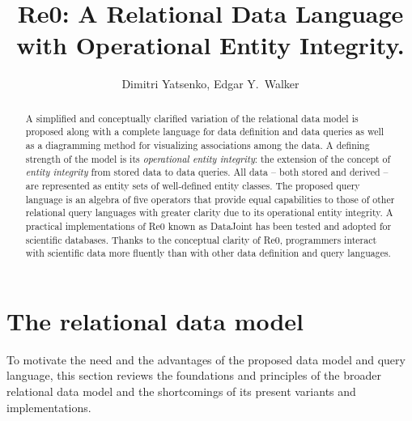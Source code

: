 \documentclass[letter,twocolumn,11pt]{article}
\title{Re0: A Relational Data Language with Operational Entity Integrity.}
\author{Dimitri Yatsenko, Edgar Y.\ Walker}
\begin{document}
\maketitle
\begin{abstract}
A simplified and conceptually clarified variation of the relational data model is proposed along with a complete language for data definition and data queries as well as a diagramming method for visualizing associations among the data.  
A defining strength of the model is its \emph{operational entity integrity}: the extension of the concept of \emph{entity integrity} from stored data to data queries. 
All data -- both stored and derived -- are represented as entity sets of well-defined entity classes.  
The proposed query language is an algebra of five operators that provide equal capabilities to those of other relational query languages with greater clarity due to its operational entity integrity. 
A practical implementations of Re0 known as DataJoint has been tested and adopted for scientific databases.  
Thanks to the conceptual clarity of Re0, programmers interact with scientific data more fluently than with other data definition and query languages.

\end{abstract}

\section{The relational data model}
To motivate the need and the advantages of the proposed data model and query language, this section reviews the foundations and principles of the broader relational data model and the shortcomings of its present variants and implementations. 
\end{document}
